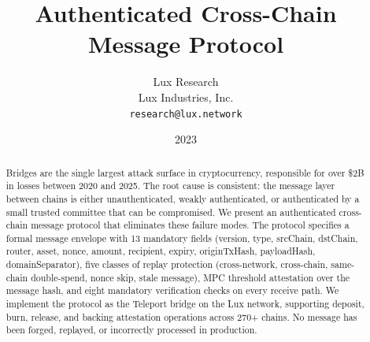 \documentclass[11pt,a4paper]{article}
\title{Authenticated Cross-Chain\\Message Protocol}
\author{
Lux Research \\
Lux Industries, Inc.\\
\texttt{research@lux.network}
}
\date{2023}
\begin{document}
\luxcoverpage

\begin{abstract}
Bridges are the single largest attack surface in cryptocurrency, responsible for over \$2B in losses between 2020 and 2025. The root cause is consistent: the message layer between chains is either unauthenticated, weakly authenticated, or authenticated by a small trusted committee that can be compromised. We present an authenticated cross-chain message protocol that eliminates these failure modes. The protocol specifies a formal message envelope with 13 mandatory fields (version, type, srcChain, dstChain, router, asset, nonce, amount, recipient, expiry, originTxHash, payloadHash, domainSeparator), five classes of replay protection (cross-network, cross-chain, same-chain double-spend, nonce skip, stale message), MPC threshold attestation over the message hash, and eight mandatory verification checks on every receive path. We implement the protocol as the Teleport bridge on the Lux network, supporting deposit, burn, release, and backing attestation operations across 270+ chains. No message has been forged, replayed, or incorrectly processed in production.
\end{abstract}












\end{document}
